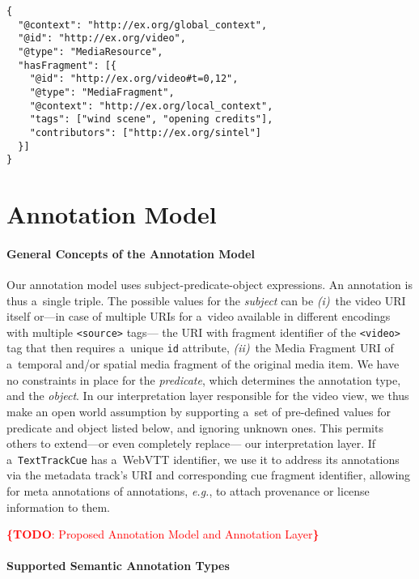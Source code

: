 \documentclass{sig-alternate}
\newcommand{\inlinelistingsize}{\fontsize{8pt}{11pt}}
\let\oldurl\url
\renewcommand{\url}[1]{\inlinelistingsize\oldurl{#1}}
\newcommand{\todo}[1]{\noindent\textcolor{red}{{\bf \{TODO}: #1{\bf \}}}}
\def\JSONLD{\mbox{JSON-LD}}
\begin{document}
\begin{lstlisting}[caption={Generated \JSONLD~for the Web of Data, see
    \url{http://bit.ly/webvtt-jsonld} for the RDF triples},
  label=listing:jsonld, float=t!]
{
  "@context": "http://ex.org/global_context",
  "@id": "http://ex.org/video",
  "@type": "MediaResource",
  "hasFragment": [{
    "@id": "http://ex.org/video#t=0,12",
    "@type": "MediaFragment",
    "@context": "http://ex.org/local_context",
    "tags": ["wind scene", "opening credits"],
    "contributors": ["http://ex.org/sintel"]
  }]
}
\end{lstlisting}

\section{Annotation Model}

\paragraph{General Concepts of the Annotation Model}

Our annotation model uses subject-predicate-object expressions.
An annotation is thus a~single triple.
The possible values for the \emph{subject} can be \emph{(i)}~the video
URI itself or---in case of multiple URIs for a~video available
in different encodings with multiple \texttt{<source>} tags---%
the URI with fragment identifier of the \texttt{<video>} tag
that then requires a~unique \texttt{id} attribute,
\emph{(ii)}~the Media Fragment URI of a~temporal and/or spatial
media fragment of the original media item.
We have no constraints in place for the \emph{predicate},
which determines the annotation type, and the \emph{object}.
In our interpretation layer responsible for the video view,
we thus make an open world assumption
by supporting a~set of pre-defined values for predicate and object
listed below, and ignoring unknown ones.
This permits others to extend---or even completely replace---%
our interpretation layer.
If a~\texttt{TextTrackCue} has a~WebVTT identifier,
we use it to address its annotations
via the metadata track's URI
and corresponding cue fragment identifier,
allowing for meta annotations of annotations, \emph{e.g.},
to attach provenance or license information to them.

\todo{Proposed Annotation Model and Annotation Layer}

\paragraph{Supported Semantic Annotation Types}
\end{document}
